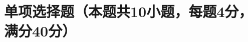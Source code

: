 \documentclass{USTBExam}
\author{北京科技大学学生学习与发展指导中心·朋辈讲师团·高数组·黄腾}
\begin{document}
\maketitle

\section{单项选择题（本题共10小题，每题4分，满分40分）}

\begin{problem}

\paren[]
\begin{choices}
	\item
	\item
	\item
	\item
\end{choices}
\end{problem}

\begin{problem}

\paren[]
\begin{choices}
	\item
	\item
	\item
	\item
\end{choices}
\end{problem}

\begin{problem}

\paren[]
\begin{choices}
	\item
	\item
	\item
	\item
\end{choices}
\end{problem}

\begin{problem}

\paren[]
\begin{choices}
	\item
	\item
	\item
	\item
\end{choices}
\end{problem}

\begin{problem}

\paren[]
\begin{choices}
	\item
	\item
	\item
	\item
\end{choices}
\end{problem}
\end{document}
